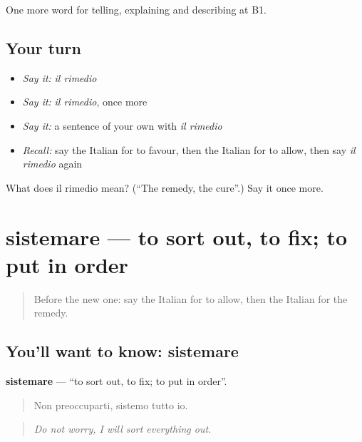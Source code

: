 \begin{grammarlens}[title={What you've built}]
One more word for telling, explaining and describing at B1.
\end{grammarlens}

\subsection*{Your turn}
\begin{itemize}
\raggedright
  \item \emph{Say it:} \emph{il rimedio}
  \item \emph{Say it:} \emph{il rimedio}, once more
  \item \emph{Say it:} a sentence of your own with \emph{il rimedio}
  \item \emph{Recall:} say the Italian for to favour, then the Italian for to allow, then say \emph{il rimedio} again
\end{itemize}

\begin{tcolorbox}[breakable,colback=teal!4,colframe=teal!35!black,title={Before you move on}]
What does il rimedio mean? (\textquotedblleft{}The remedy, the cure\textquotedblright{}.) Say it once more.
\end{tcolorbox}
\section[sistemare]{sistemare — to sort out, to fix; to put in order}

\label{lesson:IT-C355-sistemare}



\begin{quote}
Before the new one: say the Italian for to allow, then the Italian for the remedy.
\end{quote}

\subsection*{You'll want to know: sistemare}
\textbf{sistemare} — \textquotedblleft{}to sort out, to fix; to put in order\textquotedblright{}.

\begin{quote}
Non preoccuparti, sistemo tutto io.
\end{quote}

\begin{quote}
\emph{Do not worry, I will sort everything out.}
\end{quote}

